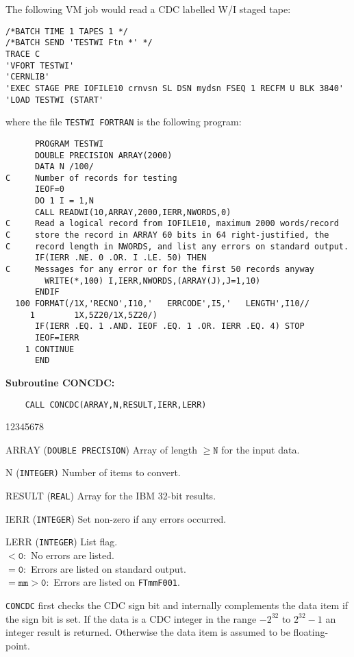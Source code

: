 The following VM job would read a CDC labelled W/I staged tape:
\begin{verbatim}
/*BATCH TIME 1 TAPES 1 */
/*BATCH SEND 'TESTWI Ftn *' */
TRACE C
'VFORT TESTWI'
'CERNLIB'
'EXEC STAGE PRE IOFILE10 crnvsn SL DSN mydsn FSEQ 1 RECFM U BLK 3840'
'LOAD TESTWI (START'
\end{verbatim}
where the file {\tt TESTWI FORTRAN} is the following program:
\begin{verbatim}
      PROGRAM TESTWI
      DOUBLE PRECISION ARRAY(2000)
      DATA N /100/
C     Number of records for testing
      IEOF=0
      DO 1 I = 1,N
      CALL READWI(10,ARRAY,2000,IERR,NWORDS,0)
C     Read a logical record from IOFILE10, maximum 2000 words/record
C     store the record in ARRAY 60 bits in 64 right-justified, the
C     record length in NWORDS, and list any errors on standard output.
      IF(IERR .NE. 0 .OR. I .LE. 50) THEN
C     Messages for any error or for the first 50 records anyway
        WRITE(*,100) I,IERR,NWORDS,(ARRAY(J),J=1,10)
      ENDIF
  100 FORMAT(/1X,'RECNO',I10,'   ERRCODE',I5,'   LENGTH',I10//
     1        1X,5Z20/1X,5Z20/)
      IF(IERR .EQ. 1 .AND. IEOF .EQ. 1 .OR. IERR .EQ. 4) STOP
      IEOF=IERR
    1 CONTINUE
      END
\end{verbatim}
{\bf Subroutine CONCDC:}
\begin{verbatim}
    CALL CONCDC(ARRAY,N,RESULT,IERR,LERR)
\end{verbatim}
\begin{DLtt}{12345678}
\item[ARRAY] ({\tt DOUBLE PRECISION}) Array of length $\mathtt{\geq N}$
for the input data.
\item[N] ({\tt INTEGER)} Number of items to convert.
\item[RESULT] ({\tt REAL}) Array for the IBM 32-bit results.
\item[IERR] ({\tt INTEGER}) Set non-zero if any errors occurred.
\item[LERR] ({\tt INTEGER}) List flag. \\
$\mathtt{< 0:}$ No errors are listed. \\
$\mathtt{= 0:}$ Errors are listed on standard output. \\
$\mathtt{= mm > 0:}$ Errors are listed on {\tt FTmmF001}.
\end{DLtt}
\Method
{\tt CONCDC} first checks the CDC sign bit and internally
complements the data item if the sign bit is set. If the data is a
CDC integer in the range $-2^{32}$ to $2^{32}-1$ an integer result
is returned. Otherwise the data item is assumed to be floating-point.
